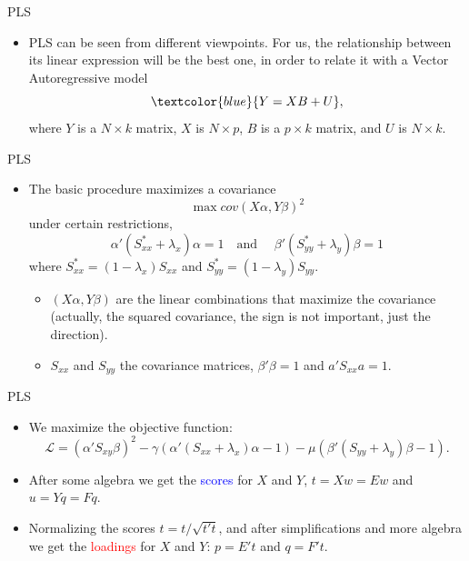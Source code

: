 \documentclass{beamer}
\newcommand{\?}{?`}
\begin{document}
\begin{frame}{PLS}
  \begin{itemize}
  \item PLS can be seen from different viewpoints. For us, the relationship between its linear expression
  will be the best one, in order to relate it with a Vector Autoregressive model
\medskip
   \begin{displaymath}
      \textcolor{blue}{Y=XB+U},
    \end{displaymath}
    \bigskip
    where $Y$ is a $N\times k$ matrix, $X$ is $N\times p$, $B$ is a
     $p\times k$ matrix, and  $U$ is  $N\times k$.
  \end{itemize}
\end{frame}



\begin{frame}{PLS}
  \begin{itemize}
  \item The basic procedure maximizes a covariance
    \begin{displaymath}
      \max cov(X\alpha,Y\beta)^2
    \end{displaymath}
    under certain restrictions,
    \begin{displaymath}
      \alpha'(S_{xx}^{*}+\lambda_x)\alpha = 1 \quad \text{and } \quad
      \beta'(S_{yy}^{*}+\lambda_y)\beta = 1
    \end{displaymath}
    where $S_{xx}^{*}=(1-\lambda_x)S_{xx}$ and
    $S_{yy}^{*}=(1-\lambda_y)S_{yy}$.
    \begin{itemize}
    \item $(X\alpha,Y\beta)$ are the linear combinations that  maximize the covariance (actually, the squared covariance, the sign is not important, just the direction).
    \item $S_{xx}$ and $S_{yy}$ the covariance matrices, $\beta'\beta=1$ and $a'S_{xx}a=1$.
    \end{itemize}
  \end{itemize}
\end{frame}

\begin{frame}{PLS}
  \begin{itemize}
  \item We maximize the objective function:
    \begin{displaymath}
      \mathcal{L}=
      (\alpha'S_{xy}\beta)^2-\gamma(\alpha'(S_{xx}+\lambda_x)\alpha-1)
      - \mu(\beta'(S_{yy}+\lambda_y)\beta-1).
    \end{displaymath}
  \item After some algebra we get the {\textcolor{blue}{scores}} for  $X$ and
    $Y$, $t=Xw=Ew$ and $u=Yq=Fq$.
  \item  Normalizing the scores   $t=t/\sqrt{t't}$, and after simplifications and more algebra we get
  the \textcolor{red}{loadings} for  $X$ and $Y$: $p=E't$ and $q=F't$.
  \end{itemize}
\end{frame}
\end{document}
